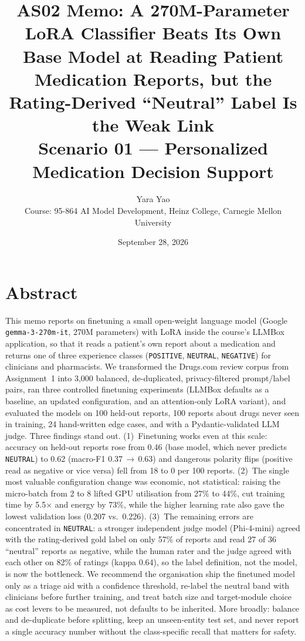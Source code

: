 \documentclass[11pt]{article}
\title{\vspace{-1.5em}\textbf{AS02 Memo: A 270M-Parameter LoRA Classifier Beats Its Own Base Model at Reading Patient Medication Reports, but the Rating-Derived ``Neutral'' Label Is the Weak Link}\\
\large Scenario 01 --- Personalized Medication Decision Support}
\author{Yara Yao \\ Course: 95-864 AI Model Development, Heinz College, Carnegie Mellon University}
\date{September 28, 2026}
\newcommand{\code}[1]{\texttt{#1}}
\begin{document}
\maketitle
\vspace{-1.5em}

\section*{Abstract}
This memo reports on finetuning a small open-weight language model (Google \code{gemma-3-270m-it}, 270M parameters) with LoRA inside the course's LLMBox application, so that it reads a patient's own report about a medication and returns one of three experience classes (\code{POSITIVE}, \code{NEUTRAL}, \code{NEGATIVE}) for clinicians and pharmacists. We transformed the Drugs.com review corpus from Assignment~1 into 3,000 balanced, de-duplicated, privacy-filtered prompt/label pairs, ran three controlled finetuning experiments (LLMBox defaults as a baseline, an updated configuration, and an attention-only LoRA variant), and evaluated the models on 100 held-out reports, 100 reports about drugs never seen in training, 24 hand-written edge cases, and with a Pydantic-validated LLM judge. Three findings stand out. (1)~Finetuning works even at this scale: accuracy on held-out reports rose from 0.46 (base model, which never predicts \code{NEUTRAL}) to 0.62 (macro-F1 0.37\,$\to$\,0.63) and dangerous polarity flips (positive read as negative or vice versa) fell from 18 to 0 per 100 reports. (2)~The single most valuable configuration change was economic, not statistical: raising the micro-batch from 2 to 8 lifted GPU utilisation from 27\% to 44\%, cut training time by 5.5$\times$ and energy by 73\%, while the higher learning rate also gave the lowest validation loss (0.207 vs.\ 0.226). (3)~The remaining errors are concentrated in \code{NEUTRAL}: a stronger independent judge model (Phi-4-mini) agreed with the rating-derived gold label on only 57\% of reports and read 27 of 36 ``neutral'' reports as negative, while the human rater and the judge agreed with each other on 82\% of ratings (kappa 0.64), so the label definition, not the model, is now the bottleneck. We recommend the organisation ship the finetuned model only as a triage aid with a confidence threshold, re-label the neutral band with clinicians before further training, and treat batch size and target-module choice as cost levers to be measured, not defaults to be inherited. More broadly: balance and de-duplicate before splitting, keep an unseen-entity test set, and never report a single accuracy number without the class-specific recall that matters for safety.
\end{document}
